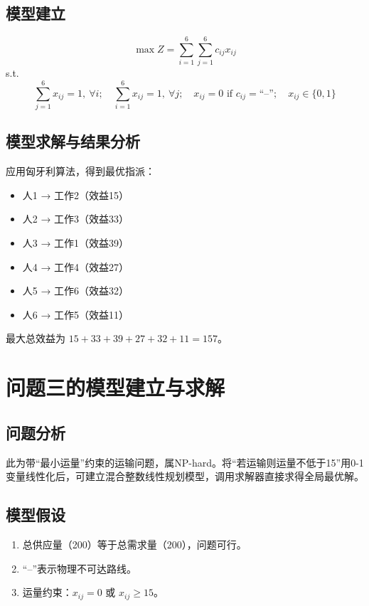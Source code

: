 \documentclass[12pt]{ctexart}
\begin{document}
\subsection{模型建立}
\[
\max Z = \sum_{i=1}^{6}\sum_{j=1}^{6} c_{ij}x_{ij}
\]
s.t.
\[
\sum_{j=1}^{6} x_{ij} = 1,\ \forall i;\quad
\sum_{i=1}^{6} x_{ij} = 1,\ \forall j;\quad
x_{ij} = 0 \text{ if } c_{ij} = \text{``--''};\quad
x_{ij} \in \{0,1\}
\]

\subsection{模型求解与结果分析}
应用匈牙利算法，得到最优指派：
\begin{itemize}
    \item 人1 → 工作2（效益15）
    \item 人2 → 工作3（效益33）
    \item 人3 → 工作1（效益39）
    \item 人4 → 工作4（效益27）
    \item 人5 → 工作6（效益32）
    \item 人6 → 工作5（效益11）
\end{itemize}
最大总效益为 $15 + 33 + 39 + 27 + 32 + 11 = 157$。

\section{问题三的模型建立与求解}

\subsection{问题分析}
此为带“最小运量”约束的运输问题，属NP-hard。将“若运输则运量不低于15”用0-1变量线性化后，可建立混合整数线性规划模型，调用求解器直接求得全局最优解。

\subsection{模型假设}
\begin{enumerate}[label=(\arabic*)]
    \item 总供应量（200）等于总需求量（200），问题可行。
    \item “–”表示物理不可达路线。
    \item 运量约束：$x_{ij} = 0$ 或 $x_{ij} \geq 15$。
\end{enumerate}
\end{document}
